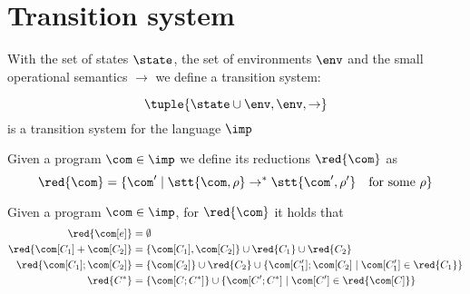 \section{Transition system}

With the set of states \(\state\), the set of environments \(\env\)
and the small operational semantics \(\to\) we define a transition
system:

\begin{definition}
  \[\tuple{\state \cup \env, \env, \to}\] is a transition system for
  the language \(\imp\)
\end{definition}

\begin{definition}[Reductions]
  Given a program \(\com\in\imp\) we define its reductions
  \(\red{\com}\) as \[\red{\com} = \{\com' \mid \stt{\com, \rho} \to^*
  \stt{\com', \rho'} \quad \text{for some } \rho\}\]
\end{definition}

\begin{lemma}\label{le:tosets}
  Given a program \(\com\in\imp\), for \(\red{\com}\) it holds that
  \begin{align*}
    \red{\com[e]} & = \emptyset \\
    \red{\com[C_1] + \com[C_2]} & = \{\com[C_1], \com[C_2]\}\cup\red{C_1}\cup\red{C_2} \\
    \red{\com[C_1];\com[C_2]} & = \{\com[C_2]\}\cup\red{C_2}\cup\{\com[C_1'];\com[C_2] \mid \com[C_1']\in\red{C_1}\} \\
    \red{C^*} & = \{\com[C;C^*]\} \cup \{\com[C';C^*] \mid \com[C']\in\red{\com[C]}\}
  \end{align*}
\end{lemma}

